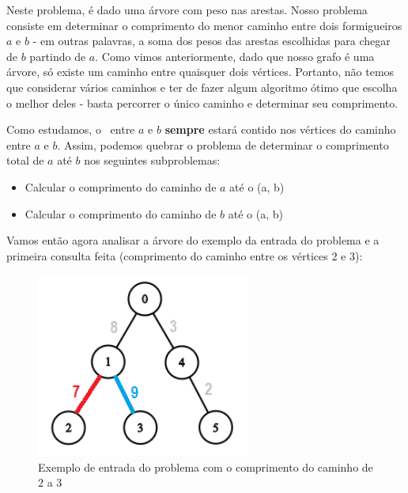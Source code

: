{\begin{mdframed}[backgroundcolor=blue!5]
\vspace{-0.4cm}
\end{mdframed}}

\vspace{10cm}

Neste problema, é dado uma árvore com peso nas arestas. Nosso problema consiste em determinar o comprimento do menor caminho entre dois formigueiros $a$ e $b$ - em outras palavras, a soma dos pesos das arestas escolhidas para chegar de $b$ partindo de $a$. Como vimos anteriormente, dado que nosso grafo é uma árvore, só existe um caminho entre quaisquer dois vértices. Portanto, não temos que considerar vários caminhos e ter de fazer algum algoritmo ótimo que escolha o melhor deles - basta percorrer o único caminho e determinar seu comprimento.

Como estudamos, o \LCA\ entre $a$ e $b$ \textbf{sempre} estará contido nos vértices do caminho entre $a$ e $b$. Assim, podemos quebrar o problema de determinar o comprimento total de $a$ até $b$ nos seguintes subproblemas:

\begin{itemize}
    \item Calcular o comprimento do caminho de $a$ até o \LCA(a, b)
    \item Calcular o comprimento do caminho de $b$ até o \LCA(a, b)
\end{itemize}

Vamos então agora analisar a árvore do exemplo da entrada do problema e a primeira consulta feita (comprimento do caminho entre os vértices $2$ e $3$):

\begin{figure}[htb]
\begin{center}
\includegraphics[width=7cm]{images/ants10-graph.png}
\end{center}
\caption{\label{fig:arvore-euler2}Exemplo de entrada do problema com o comprimento do caminho de  $2$ a $3$}
\end{figure}

